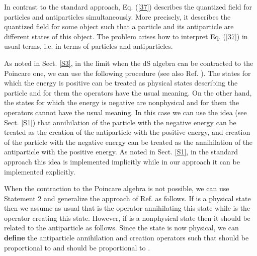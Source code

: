 \documentclass[a4paper,12pt]{article}%
\begin{document}
In contrast to the standard approach, Eq. (\ref{37}) 
describes the quantized field for particles and 
antiparticles simultaneously. More precisely, it
describes the quantized field for some object such
that a particle and its antiparticle are different
states of this object. The problem arises how to
interpret Eq. (\ref{37}) in usual terms, i.e. in
terms of particles and antiparticles. 

As noted in Sect. \ref{S3}, in the limit when the
dS algebra can be contracted to the Poincare one, we
can use the following procedure (see also Ref. 
\cite{hep}). The states for which the energy
is positive can be treated as physical 
states describing the particle and for them the 
\coordHE{} operators have the usual meaning. 
On the other hand, the states for which the energy
is negative are nonphysical and for
them the operators \coordHE{} cannot have the usual
meaning. In this case we can use the idea (see
Sect. \ref{S1}) that annihilation of the
particle with the negative energy can be treated
as the creation of the antiparticle with the
positive energy, and creation of the
particle with the negative energy can be treated
as the annihilation of the antiparticle with the
positive energy. As noted in Sect. \ref{S1}, in the
standard approach this idea is implemented
implicitly while in our approach it can be
implemented explicitly. 

\begin{sloppypar}
When the contraction to the 
Poincare algebra is not possible, we can use
Statement 2 and generalize the approach of Ref.
\cite{hep} as follows. If \coordHE{}
is a physical state then we assume as usual that
\coordHE{} is the operator annihilating this
state while \coordHE{} is the operator creating
this state. However, if \coordHE{}
is a nonphysical state then it should be related
to the antiparticle as follows. Since the state
\coordHE{} is now physical,
we can {\bf define} the antiparticle annihilation
and creation operators \coordHE{} such that
\coordHE{} should 
be proportional to \coordHE{} and
\coordHE{}  
should be proportional to \coordHE{}. 
\end{sloppypar}
\end{document}
